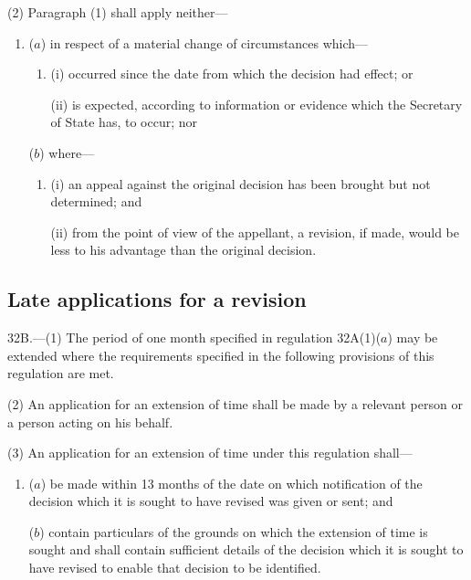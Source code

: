 \documentclass[12pt,a4paper]{article}
\begin{document}
(2) Paragraph (1) shall apply neither---
\begin{enumerate}\item[]
\begin{sloppypar}
($a$) in respect of a material change of circumstances which—
\end{sloppypar}
\begin{enumerate}\item[]
(i) occurred since the date from which the decision had effect; or

(ii) is expected, according to information or evidence which the Secretary of State has, to occur; nor
\end{enumerate}

($b$) where---
\begin{enumerate}\item[]
(i) an appeal against the original decision has been brought but not determined; and

(ii) from the point of view of the appellant, a revision, if made, would be less to his advantage than the original decision.
\end{enumerate}
\end{enumerate}


\subsection[32B. Late applications for a revision]{Late applications for a revision}

32B.—(1) The period of one month specified in regulation 32A(1)($a$) may be extended where the requirements specified in the following provisions of this regulation are met.

(2) An application for an extension of time shall be made by a relevant person or a person acting on his behalf.

(3) An application for an extension of time under this regulation shall---
\begin{enumerate}\item[]
($a$) be made within 13 months of the date on which notification of the decision which it is sought to have revised was given or sent; and

($b$) contain particulars of the grounds on which the extension of time is sought and shall contain sufficient details of the decision which it is sought to have revised to enable that decision to be identified.
\end{enumerate}
\end{document}
